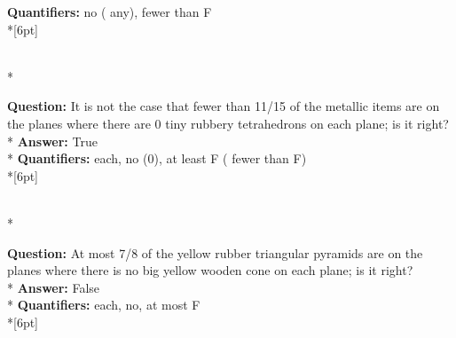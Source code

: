 \begin{figure*}
\begin{minipage}{0.48\textwidth}
\begin{minipage}[t][2.2cm][t]{1\textwidth}
      \textbf{Quantifiers:} no ( any), fewer than F  \\*[6pt]
    \end{minipage}\\*
    \begin{minipage}[t][2.2cm][t]{1\textwidth}
      \footnotesize
      \textbf{Question:} It is not the case that fewer than 11/15 of the metallic items are on the planes where there are 0 tiny rubbery tetrahedrons on each plane; is it right? \\*
      \textbf{Answer:} True \\*
      \textbf{Quantifiers:} each, no (0), at least F ( fewer than F) \\*[6pt]
    \end{minipage}\\*
    \begin{minipage}[t][2.2cm][t]{1\textwidth}
      \footnotesize
      \textbf{Question:} At most 7/8 of the yellow rubber triangular pyramids are on the planes where there is no big yellow wooden cone on each plane; is it right? \\*
      \textbf{Answer:} False \\*
      \textbf{Quantifiers:} each, no, at most F \\*[6pt]
    \end{minipage}
  \end{minipage}
  \vspace{0.2cm}
  

\end{figure*}
